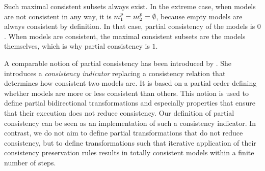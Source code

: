 \begin{definition}
\end{definition}

Such maximal consistent subsets always exist.
In the extreme case, when models are not consistent in any way, it is $\model{m}{1}^p = \model{m}{2}^p = \emptyset$, because empty models are always consistent by definition.
In that case, partial consistency of the models is $0$.
When models are consistent, the maximal consistent subsets are the models themselves, which is why partial consistency is $1$.

A comparable notion of partial consistency has been introduced by \textcite{stevens2014Partial-FASE, stevens2020BidirectionalTransformationLarge-SoSym}.
She introduces a \emph{consistency indicator} replacing a consistency relation that determines how consistent two models are.
It is based on a partial order defining whether models are more or less consistent than others.
This notion is used to define partial bidirectional transformations and especially properties that ensure that their execution does not reduce consistency.
Our definition of partial consistency can be seen as an implementation of such a consistency indicator.
In contrast, we do not aim to define partial transformations that do not reduce consistency, but to define transformations such that iterative application of their consistency preservation rules results in totally consistent models within a finite number of steps.

